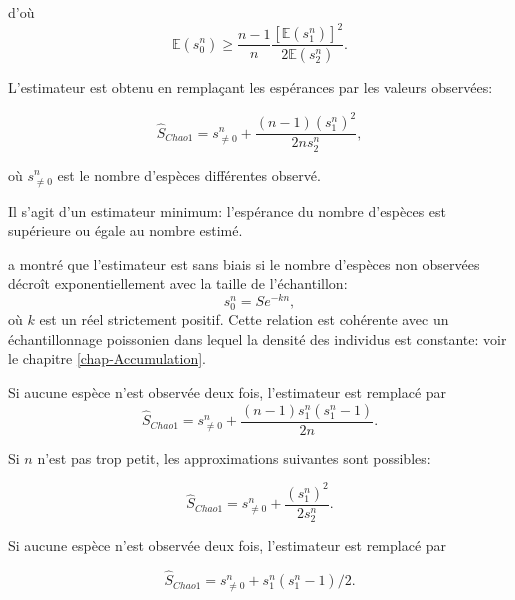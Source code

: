 \documentclass[
  11pt,
  french,
  a4paper,
  extrafontsizes,onecolumn,openright
  ]{memoir}
\begin{document}
d'où
\begin{equation}
  \label{eq:Esn0}
  {\mathbb E}(s^{n}_{0}) 
  \ge \frac{n-1}{n}\frac{\left[ {\mathbb E}(s^{n}_{1}) \right]^2}{2 {\mathbb E}(s^{n}_{2})}.
\end{equation}

L'estimateur est obtenu en remplaçant les espérances par les valeurs observées:

\begin{equation}
  \label{eq:Chao1}
  {\hat{S}}_\mathit{Chao1} 
   = s^{n}_{\ne 0} + \frac{\left(n-1 \right){\left(s^{n}_{1}\right)}^2}{2n{s^{n}_{2}}},
\end{equation}

où \(s^{n}_{\ne 0}\) est le nombre d'espèces différentes observé.

Il s'agit d'un estimateur minimum: l'espérance du nombre d'espèces est supérieure ou égale au nombre estimé.

\textcite{Beguinot2014} a montré que l'estimateur est sans biais si le nombre d'espèces non observées décroît exponentiellement avec la taille de l'échantillon:
\begin{equation}
  \label{eq:BiaisChao}
  s^{n}_{0} = S e^{-kn},
\end{equation}
où \(k\) est un réel strictement positif.
Cette relation est cohérente avec un échantillonnage poissonien dans lequel la densité des individus est constante: voir le chapitre \ref{chap-Accumulation}.

Si aucune espèce n'est observée deux fois, l'estimateur est remplacé par
\begin{equation}
  \label{eq:Chao1sansf2}
  {\hat{S}}_\mathit{Chao1} = s^{n}_{\ne 0} + \frac{\left(n-1\right){s^{n}_{1}}\left(s^{n}_{1}-1\right)}{2n}.
\end{equation}

Si \(n\) n'est pas trop petit, les approximations suivantes sont possibles:

\begin{equation}
  \label{eq:Chao1sansn}
  \hat{S}_\mathit{Chao1}
   = {s^{n}_{\ne 0}} + \frac{{\left(s^{n}_{1}\right)}^2}{2s^{n}_{2}}.
\end{equation}

Si aucune espèce n'est observée deux fois, l'estimateur est remplacé \autocite{Chao2004} par

\begin{equation}
  \label{eq:Chao1sansnf2}
  {\hat{S}}_\mathit{Chao1} 
  = {s^{n}_{\ne 0}}+{s^{n}_{1}\left(s^{n}_{1}-1\right)}/{2}.
\end{equation}
\end{document}
